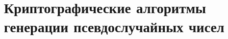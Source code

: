 \renewcommand\figurename{Рисунок}
\renewcommand\tablename{Таблица}
\renewcommand\contentsname{Содержание}
\renewcommand\bibname{Библиография}

\def\draftlogo{\scshape\small СТБ 34.101.47-20XX}
\providecommand{\HMAC}{\texttt{hmac}\xspace}

\pagestyle{myheadings}


\tableofcontents
\clearpage
\thispagestyle{empty}
\mbox{}

\pagestyle{headings}








\chapter{Криптографические алгоритмы генерации псевдослучайных чисел}





 
 
 
 



